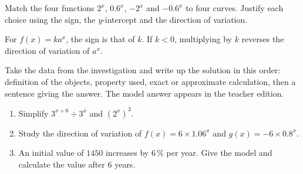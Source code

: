 \begin{activite}
Match the four functions $2^x$, $0.6^x$, $-2^x$ and $-0.6^x$ to four curves. Justify each choice using the sign, the $y$-intercept and the direction of variation.
\begin{center}\end{center}
\end{activite}

\begin{traceecrite}For $f(x)=ka^x$, the sign is that of $k$. If $k<0$, multiplying by $k$ reverses the direction of variation of $a^x$.\end{traceecrite}

\begin{exemple}
Take the data from the investigation and write up the solution in this order: definition of the objects, property used, exact or approximate calculation, then a sentence giving the answer. The model answer appears in the teacher edition.
\end{exemple}

\begin{exercice}[-- essential]
\begin{enumerate}\item Simplify $3^{x+6}\div3^x$ and $(2^x)^3$.\item Study the direction of variation of $f(x)=6\times1.06^x$ and $g(x)=-6\times0.8^x$.\item An initial value of $1450$ increases by $6\,\%$ per year. Give the model and calculate the value after $6$ years.\end{enumerate}
\end{exercice}

